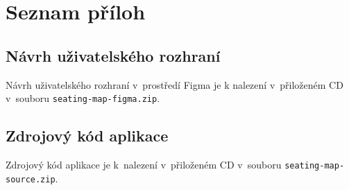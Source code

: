 \chapter*{Seznam příloh}
\renewcommand{\thesection}{Příloha \Alph{section}}

\section{Návrh uživatelského rozhraní}
Návrh uživatelského rozhraní v~prostředí Figma je k nalezení v~přiloženém CD v~souboru \texttt{seating-map-figma.zip}.

\newpage
\section{Zdrojový kód aplikace}
Zdrojový kód aplikace je k~nalezení v~přiloženém CD v~souboru \texttt{seating-map-source.zip}.
